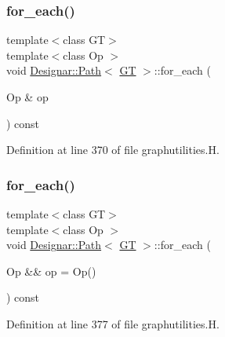 \subsubsection{\texorpdfstring{for\+\_\+each()}{for\_each()}\hspace{0.1cm}{\footnotesize\ttfamily [1/4]}}
{\footnotesize\ttfamily template$<$class GT$>$ \\
template$<$class Op $>$ \\
void \hyperlink{class_designar_1_1_path}{Designar\+::\+Path}$<$ \hyperlink{demo-buildgraph_8_c_a3001c40d2c31ca87ed96cd7d1334a55e}{GT} $>$\+::for\+\_\+each (\begin{DoxyParamCaption}\item[{Op \&}]{op }\end{DoxyParamCaption}) const\hspace{0.3cm}{\ttfamily [inline]}}



Definition at line 370 of file graphutilities.\+H.

\mbox{\label{class_designar_1_1_path_acc53d7be8093a53e860e283bcf96593f}} 
\subsubsection{\texorpdfstring{for\+\_\+each()}{for\_each()}\hspace{0.1cm}{\footnotesize\ttfamily [2/4]}}
{\footnotesize\ttfamily template$<$class GT$>$ \\
template$<$class Op $>$ \\
void \hyperlink{class_designar_1_1_path}{Designar\+::\+Path}$<$ \hyperlink{demo-buildgraph_8_c_a3001c40d2c31ca87ed96cd7d1334a55e}{GT} $>$\+::for\+\_\+each (\begin{DoxyParamCaption}\item[{Op \&\&}]{op = {\ttfamily Op()} }\end{DoxyParamCaption}) const\hspace{0.3cm}{\ttfamily [inline]}}



Definition at line 377 of file graphutilities.\+H.

\mbox{\label{class_designar_1_1_path_a3cfa609d28037e6da0ee380150369c7a}} 
